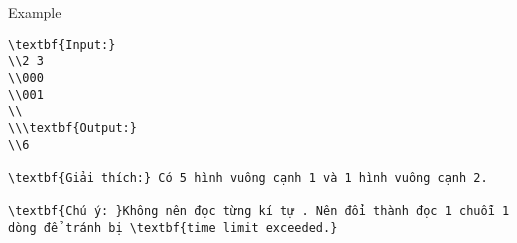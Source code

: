 Example
\begin{verbatim}
\textbf{Input:}
\\2 3
\\000
\\001
\\
\\\textbf{Output:}
\\6

\textbf{Giải thích:} Có 5 hình vuông cạnh 1 và 1 hình vuông cạnh 2.

\textbf{Chú ý: }Không nên đọc từng kí tự . Nên đổi thành đọc 1 chuỗi 1 dòng để tránh bị \textbf{time limit exceeded.}\end{verbatim}